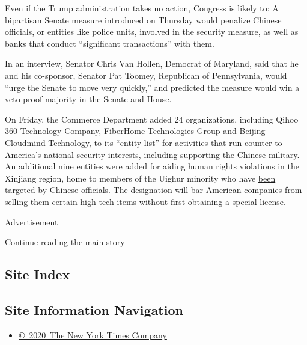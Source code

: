 Even if the Trump administration takes no action, Congress is likely to:
A bipartisan Senate measure introduced on Thursday would penalize
Chinese officials, or entities like police units, involved in the
security measure, as well as banks that conduct ``significant
transactions'' with them.

In an interview, Senator Chris Van Hollen, Democrat of Maryland, said
that he and his co-sponsor, Senator Pat Toomey, Republican of
Pennsylvania, would ``urge the Senate to move very quickly,'' and
predicted the measure would win a veto-proof majority in the Senate and
House.

On Friday, the Commerce Department added 24 organizations, including
Qihoo 360 Technology Company, FiberHome Technologies Group and Beijing
Cloudmind Technology, to its ``entity list'' for activities that run
counter to America's national security interests, including supporting
the Chinese military. An additional nine entities were added for aiding
human rights violations in the Xinjiang region, home to members of the
Uighur minority who have
\href{https://www.nytimes3xbfgragh.onion/2020/05/09/us/politics/china-uighurs-arrest.html}{been
targeted by Chinese officials}. The designation will bar American
companies from selling them certain high-tech items without first
obtaining a special license.

Advertisement

\protect\hyperlink{after-bottom}{Continue reading the main story}

\hypertarget{site-index}{%
\subsection{Site Index}\label{site-index}}

\hypertarget{site-information-navigation}{%
\subsection{Site Information
Navigation}\label{site-information-navigation}}

\begin{itemize}
\tightlist
\item
  \href{https://help.nytimes3xbfgragh.onion/hc/en-us/articles/115014792127-Copyright-notice}{©~2020~The
  New York Times Company}
\end{itemize}

